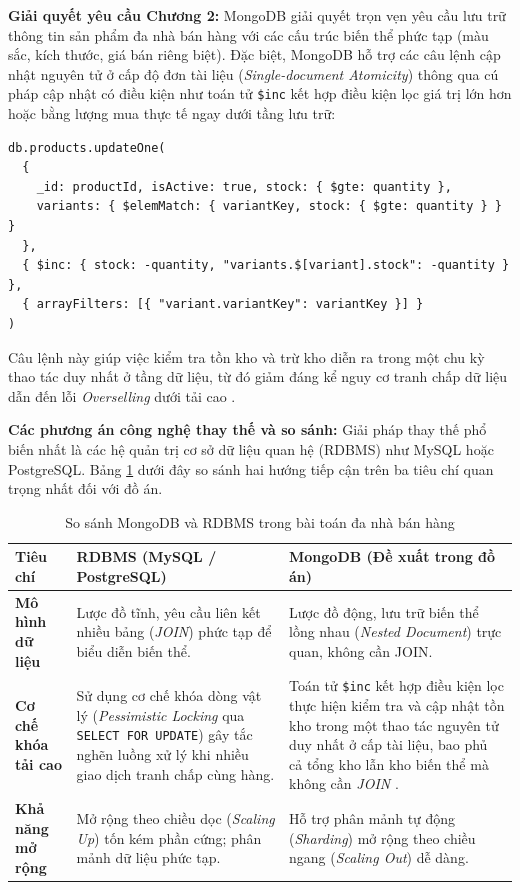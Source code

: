 \documentclass[../DoAn.tex]{subfiles}
\begin{document}
\textbf{Giải quyết yêu cầu Chương 2:}
MongoDB giải quyết trọn vẹn yêu cầu lưu trữ thông tin sản phẩm đa nhà bán hàng với các cấu trúc biến thể phức tạp (màu sắc, kích thước, giá bán riêng biệt). Đặc biệt, MongoDB hỗ trợ các câu lệnh cập nhật nguyên tử ở cấp độ đơn tài liệu (\textit{Single-document Atomicity}) thông qua cú pháp cập nhật có điều kiện như toán tử \texttt{\$inc} kết hợp điều kiện lọc giá trị lớn hơn hoặc bằng lượng mua thực tế ngay dưới tầng lưu trữ:
\begin{lstlisting}[breaklines=true,basicstyle=\ttfamily\small,columns=fullflexible]
db.products.updateOne(
  {
    _id: productId, isActive: true, stock: { $gte: quantity },
    variants: { $elemMatch: { variantKey, stock: { $gte: quantity } } }
  },
  { $inc: { stock: -quantity, "variants.$[variant].stock": -quantity } },
  { arrayFilters: [{ "variant.variantKey": variantKey }] }
)
\end{lstlisting}
Câu lệnh này giúp việc kiểm tra tồn kho và trừ kho diễn ra trong một chu kỳ thao tác duy nhất ở tầng dữ liệu, từ đó giảm đáng kể nguy cơ tranh chấp dữ liệu dẫn đến lỗi \textit{Overselling} dưới tải cao \cite{nosql-performance}.

\textbf{Các phương án công nghệ thay thế và so sánh:}
Giải pháp thay thế phổ biến nhất là các hệ quản trị cơ sở dữ liệu quan hệ (RDBMS) như MySQL hoặc PostgreSQL. Bảng \ref{table:db_compare} dưới đây so sánh hai hướng tiếp cận trên ba tiêu chí quan trọng nhất đối với đồ án.

\begin{table}[H]
    \centering
    \caption{So sánh MongoDB và RDBMS trong bài toán đa nhà bán hàng}
    \label{table:db_compare}
    \setlength{\tabcolsep}{4pt}
    \begin{tabular}{|>{\raggedright\arraybackslash}p{2.4cm}|>{\raggedright\arraybackslash}p{5cm}|>{\raggedright\arraybackslash}p{5.6cm}|}
    \hline
    \textbf{Tiêu chí} & \textbf{RDBMS (MySQL / PostgreSQL)} & \textbf{MongoDB (Đề xuất trong đồ án)} \\ \hline
    \textbf{Mô hình dữ liệu} & Lược đồ tĩnh, yêu cầu liên kết nhiều bảng (\textit{JOIN}) phức tạp để biểu diễn biến thể. & Lược đồ động, lưu trữ biến thể lồng nhau (\textit{Nested Document}) trực quan, không cần JOIN. \\ \hline
    \textbf{Cơ chế khóa tải cao} & Sử dụng cơ chế khóa dòng vật lý (\textit{Pessimistic Locking} qua \texttt{SELECT FOR UPDATE}) gây tắc nghẽn luồng xử lý khi nhiều giao dịch tranh chấp cùng hàng. & Toán tử \texttt{\$inc} kết hợp điều kiện lọc thực hiện kiểm tra và cập nhật tồn kho trong một thao tác nguyên tử duy nhất ở cấp tài liệu, bao phủ cả tổng kho lẫn kho biến thể mà không cần \textit{JOIN} \cite{rdbms-vs-nosql}. \\ \hline
    \textbf{Khả năng mở rộng} & Mở rộng theo chiều dọc (\textit{Scaling Up}) tốn kém phần cứng; phân mảnh dữ liệu phức tạp. & Hỗ trợ phân mảnh tự động (\textit{Sharding}) mở rộng theo chiều ngang (\textit{Scaling Out}) dễ dàng. \\ \hline
    \end{tabular}
\end{table}
\end{document}
